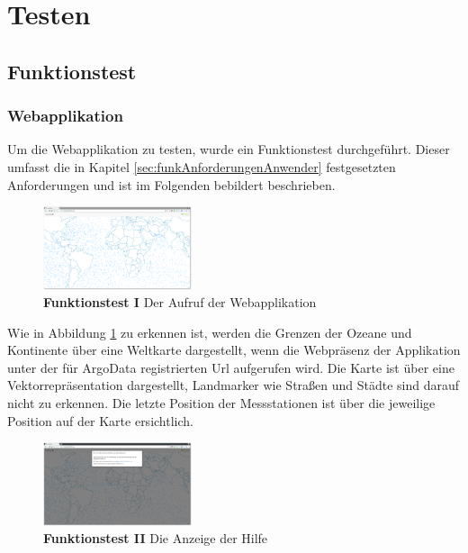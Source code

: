 \section{Testen}

\subsection{Funktionstest}

\subsubsection{Webapplikation}

Um die Webapplikation zu testen, wurde ein Funktionstest durchgeführt. Dieser umfasst die in Kapitel \ref{sec:funkAnforderungenAnwender} festgesetzten Anforderungen und ist im Folgenden bebildert beschrieben.\newline



\begin{figure}
 \centering
 \includegraphics[width=0.39\textwidth]{pix/ftest/001.png}

 \caption{\textbf{Funktionstest I} Der Aufruf der Webapplikation}
 \label{fig:ftest001}
\end{figure}


Wie in Abbildung \ref{fig:ftest001} zu erkennen ist, werden die Grenzen der Ozeane und Kontinente über eine Weltkarte dargestellt, wenn die Webpräsenz der Applikation unter der für ArgoData registrierten Url aufgerufen wird. Die Karte ist über eine Vektorrepräsentation dargestellt, Landmarker wie Straßen und Städte sind darauf nicht zu erkennen. Die letzte Position der Messstationen ist über die jeweilige Position auf der Karte ersichtlich.
\newline\newline\newline


\begin{figure}
 \centering
 \includegraphics[width=0.39\textwidth]{pix/ftest/001b.png}
 \caption{\textbf{Funktionstest II} Die Anzeige der Hilfe}
 \label{fig:ftest001b}
\end{figure}

